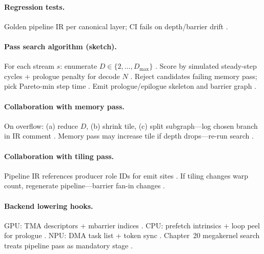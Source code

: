 \paragraph{Regression tests.}
Golden pipeline IR per canonical layer; CI fails on depth/barrier drift \citep{yirage2026,wu2024mirage,taxbreak2026}.

\paragraph{Pass search algorithm (sketch).}
For each stream $s$: enumerate $D \in \{2,\ldots,D_{\max}\}$ \citep{yirage2026,dao2022flashattention}.
Score by simulated steady-step cycles + prologue penalty for decode $N$ \citep{patel2025llminference,semianalysis2024tma}.
Reject candidates failing memory pass; pick Pareto-min step time \citep{wu2024mirage,chen2020compilerbasedhardw,memoryfloor2026}.
Emit prologue/epilogue skeleton and barrier graph \citep{shah2024flashattention3,yirage2026}.

\paragraph{Collaboration with memory pass.}
On overflow: (a) reduce $D$, (b) shrink tile, (c) split subgraph---log chosen branch in IR comment \citep{yirage2026,wu2024mirage,mpk2025}.
Memory pass may increase tile if depth drops---re-run search \citep{dao2022flashattention,chen2020compilerbasedhardw}.

\paragraph{Collaboration with tiling pass.}
Pipeline IR references producer role IDs for emit sites \citep{shah2024flashattention3,yirage2026,semianalysis2024tma}.
If tiling changes warp count, regenerate pipeline---barrier fan-in changes \citep{nvidia2022hopper,patel2025llminference}.

\paragraph{Backend lowering hooks.}
GPU: TMA descriptors + mbarrier indices \citep{semianalysis2024tma,nvidia2022hopper}.
CPU: prefetch intrinsics + loop peel for prologue \citep{dlbook,yirage2026}.
NPU: DMA task list + token sync \citep{amd2024xdna,amd2024aie,chen2020compilerbasedhardw}.
Chapter~20 megakernel search treats pipeline pass as mandatory stage \citep{mpk2025,wu2024mirage}.

